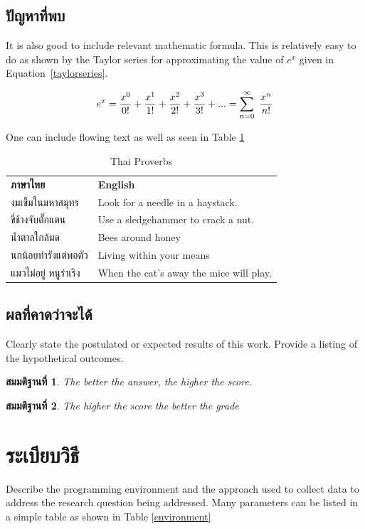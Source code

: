 \documentclass[10pt,twocolumn,twoside,a4paper]{article}
\newtheorem{hyp}{สมมติฐานที่}
\begin{document}
\subsection{ปัญหาที่พบ}
\label{purpose}


It is also good to include relevant mathematic formula. This is relatively easy to do as shown by the Taylor series for approximating the value of $e^x$ given in Equation~\ref{taylorseries}.

\begin{equation}
\label{taylorseries}
e^x = {x^0\over 0!} + {x^1\over 1!} + {x^2\over 2!} +{x^3\over 3!} + ...= \sum^\infty_{n=0}\ {x^n\over n!}
\end{equation}

One can include flowing text as well as seen in Table \ref{Proverbs}

\begin{table}[htb]
\caption{Thai Proverbs}
\label{Proverbs}
\medskip
\begin{tabular}{p{} p{}}
\hfil\textbf{ภาษาไทย} & \hfil\textbf{English}\\
งมเข็มในมหาสมุทร & Look for a needle in a haystack.\\
ขี่ช้างจับตั๊กแตน & Use a sledgeham\-mer to crack a nut.\\
น้ำตาลใกล้มด & Bees around honey \\
นกน้อยทำรังแต่พอตัว & Living within your means\\
แมวไม่อยู่ หนูร่าเริง & When the cat’s away the mice will play.\\
\end{tabular}
\end{table}


\subsection{ผลที่คาดว่าจะได้}
\label{expectation}

Clearly state the postulated or expected results of this work. Provide a listing of the hypothetical outcomes.

\begin{hyp}
The better the answer, the higher the score.
\end{hyp}

\begin{hyp}
The higher the score the better the grade
\end{hyp}

\section{ระเบียบวิธี}
\label{methodology}
Describe the programming environment and the approach used to collect data to address the research question being addressed.
Many parameters can be listed in a simple table as shown in  Table \ref{environment}
\end{document}
